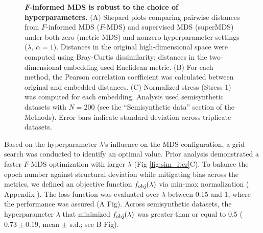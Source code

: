 \documentclass[10pt,letterpaper]{article}
\newcommand{\1}{{\rm 1}\kern-0.24em{\rm I}}
\providecommand{\DIFaddtex}[1]{{\protect\color{blue}\uwave{#1}}} %
\providecommand{\DIFdeltex}[1]{{\protect\color{red}\sout{#1}}}                      %
\providecommand{\DIFaddbegin}{} %
\providecommand{\DIFaddend}{} %
\providecommand{\DIFdelbegin}{} %
\providecommand{\DIFdelend}{} %
\providecommand{\DIFadd}[1]{\texorpdfstring{\DIFaddtex{#1}}{#1}} %
\providecommand{\DIFdel}[1]{\texorpdfstring{\DIFdeltex{#1}}{}} %
\newcommand{\DIFscaledelfig}{0.5}
\newlength{\DIFdelgraphicswidth} %
\newlength{\DIFdelgraphicsheight} %
\newcommand{\DIFaddincludegraphics}[2][]{{\color{blue}\fbox{\DIFOincludegraphics[#1]{#2}}}} %
\newcommand{\DIFdelincludegraphics}[2][]{%
\sbox{\DIFdelgraphicsbox}{\DIFOincludegraphics[#1]{#2}}%
\settoboxwidth{\DIFdelgraphicswidth}{\DIFdelgraphicsbox} %
\settoboxtotalheight{\DIFdelgraphicsheight}{\DIFdelgraphicsbox} %
\scalebox{\DIFscaledelfig}{%
\parbox[b]{\DIFdelgraphicswidth}{\usebox{\DIFdelgraphicsbox}\\[-\baselineskip] \rule{\DIFdelgraphicswidth}{0em}}\llap{\resizebox{\DIFdelgraphicswidth}{\DIFdelgraphicsheight}{%
\setlength{\unitlength}{\DIFdelgraphicswidth}%
\begin{picture}(1,1)%
\thicklines\linethickness{2pt} %
{\color[rgb]{1,0,0}\put(0,0){\framebox(1,1){}}}%
{\color[rgb]{1,0,0}\put(0,0){\line( 1,1){1}}}%
{\color[rgb]{1,0,0}\put(0,1){\line(1,-1){1}}}%
\end{picture}%
}\hspace*{3pt}}} %
} %
\DeclareRobustCommand{\DIFaddbegin}{\DIFOaddbegin \let\includegraphics\DIFaddincludegraphics} %
\DeclareRobustCommand{\DIFaddend}{\DIFOaddend \let\includegraphics\DIFOincludegraphics} %
\DeclareRobustCommand{\DIFdelbegin}{\DIFOdelbegin \let\includegraphics\DIFdelincludegraphics} %
\DeclareRobustCommand{\DIFdelend}{\DIFOaddend \let\includegraphics\DIFOincludegraphics} %
\begin{document}
\begin{figure}[h!]
    \centering
    \caption{\textbf{\textit{F}-informed MDS is robust to the choice of hyperparameters.} (A) Shepard plots comparing pairwise distances from $F$-informed MDS ($F$-MDS) and supervised MDS (superMDS) under both zero (metric MDS) and nonzero hyperparameter settings ($\lambda$, $\alpha=1$). Distances in the original high-dimensional space were computed using Bray-Curtis dissimilarity; distances in the two-dimensional embedding used Euclidean metric. (B) For each method, the Pearson correlation coefficient was calculated between original and embedded distances. (C) Normalized stress (Stress-1) was computed for each embedding. Analysis used semisynthetic datasets with $N=200$ (see the ``Semisynthetic data'' section of the Methods). Error bars indicate standard deviation across triplicate datasets.}
    \label{fig:mds_eval_sim}
\end{figure}


Based on the hyperparameter $\lambda$'s influence on the MDS configuration, a grid search was conducted to identify an optimal value. Prior analysis demonstrated a faster $F$-MDS optimization with larger $\lambda$ (Fig \ref{fig:sim_iter}C). To balance the epoch number against structural deviation while mitigating bias across the metrics, we defined an objective function $f_{\rm obj}(\lambda)$ via min-max normalization (\DIFdelbegin %
\DIFdel{Appendix }\DIFdelend \DIFaddbegin \DIFadd{Appendix C, } \DIFadd{File}\DIFaddend ). The loss function was evaluated over $\lambda$ between 0.15 and 1, where the performance was assured (A Fig). Across semisynthetic datasets, the hyperparameter $\lambda$ that minimized $f_{\rm obj}(\lambda)$ was greater than or equal to 0.5 ($0.73\pm0.19$, mean $\pm$ s.d.; see B Fig).

 
\end{document}

